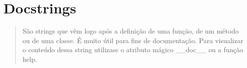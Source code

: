 \documentclass[letterpaper,10pt,brazil]{sphinxmanual}
\begin{document}
\begin{sphinxVerbatim}[commandchars=\\\{\}]
\PYG{p}{[}\PYG{p}{]}
\end{sphinxVerbatim}

\begin{sphinxVerbatim}[commandchars=\\\{\}]
\end{sphinxVerbatim}

\begin{sphinxVerbatim}[commandchars=\\\{\}]
\PYG{p}{[}\PYG{p}{]}
\end{sphinxVerbatim}

\begin{sphinxVerbatim}[commandchars=\\\{\}]
\end{sphinxVerbatim}


\section{Docstrings}
\label{\detokenize{content/str:docstrings}}\begin{quote}

São strings que vêm logo após a definição de uma função, de um método ou de uma classe.
É muito útil para fins de documentação.
Para visualizar o conteúdo dessa string utiliza\sphinxhyphen{}se o atributo mágico \_\_doc\_\_ ou a função help.
\end{quote}

\begin{sphinxVerbatim}[commandchars=\\\{\}]
 
\end{sphinxVerbatim}

\begin{sphinxVerbatim}[commandchars=\\\{\}]
\end{sphinxVerbatim}
\end{document}
